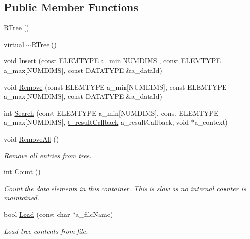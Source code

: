 \subsection*{Public Member Functions}
\begin{DoxyCompactItemize}
\item 
\hyperlink{classRTree_a09630e761ba4e88a94a4a80ad40c0700}{R\-Tree} ()
\item 
virtual \hyperlink{classRTree_aad9b714d15f488cd1747cdb619f6b7ee}{$\sim$\-R\-Tree} ()
\item 
void \hyperlink{classRTree_a98d1f0a325921db826b2a2d5a407c9be}{Insert} (const E\-L\-E\-M\-T\-Y\-P\-E a\-\_\-min\mbox{[}N\-U\-M\-D\-I\-M\-S\mbox{]}, const E\-L\-E\-M\-T\-Y\-P\-E a\-\_\-max\mbox{[}N\-U\-M\-D\-I\-M\-S\mbox{]}, const D\-A\-T\-A\-T\-Y\-P\-E \&a\-\_\-data\-Id)
\item 
void \hyperlink{classRTree_a1b4b6b4c73bc47029ba696c49265c043}{Remove} (const E\-L\-E\-M\-T\-Y\-P\-E a\-\_\-min\mbox{[}N\-U\-M\-D\-I\-M\-S\mbox{]}, const E\-L\-E\-M\-T\-Y\-P\-E a\-\_\-max\mbox{[}N\-U\-M\-D\-I\-M\-S\mbox{]}, const D\-A\-T\-A\-T\-Y\-P\-E \&a\-\_\-data\-Id)
\item 
int \hyperlink{classRTree_a3a66726a96bf3c1542d13a2991a25157}{Search} (const E\-L\-E\-M\-T\-Y\-P\-E a\-\_\-min\mbox{[}N\-U\-M\-D\-I\-M\-S\mbox{]}, const E\-L\-E\-M\-T\-Y\-P\-E a\-\_\-max\mbox{[}N\-U\-M\-D\-I\-M\-S\mbox{]}, \hyperlink{classRTree_a989db5f20fcdc26231e8b76be83caee4}{t\-\_\-result\-Callback} a\-\_\-result\-Callback, void $\ast$a\-\_\-context)
\item 
void \hyperlink{classRTree_a396f1031eb2c8224715741fd0b77349d}{Remove\-All} ()
\begin{DoxyCompactList}\small\item\em Remove all entries from tree. \end{DoxyCompactList}\item 
int \hyperlink{classRTree_a813cdf63ce3e3e255821d9ba4bc9e7df}{Count} ()
\begin{DoxyCompactList}\small\item\em Count the data elements in this container. This is slow as no internal counter is maintained. \end{DoxyCompactList}\item 
bool \hyperlink{classRTree_adbd1f87715d22ed75b2b8be738583fc2}{Load} (const char $\ast$a\-\_\-file\-Name)
\begin{DoxyCompactList}\small\item\em Load tree contents from file. \end{DoxyCompactList}\item 

\end{DoxyCompactItemize}
